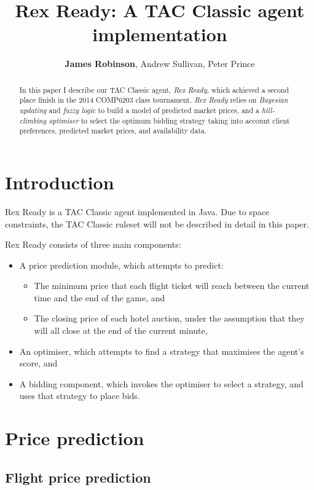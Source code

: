 \documentclass[a4paper]{proc}
\title{Rex Ready: A TAC Classic agent implementation}
\author{\textbf{James Robinson}, Andrew Sullivan, Peter Prince}
\begin{document}
\maketitle

\begin{abstract}
  In this paper I describe our TAC Classic agent, \emph{Rex Ready}, which achieved a second place finish in the 2014 COMP6203 class tournament. \emph{Rex Ready} relies on \emph{Bayesian updating} and \emph{fuzzy logic} to build a model of predicted market prices, and a \emph{hill-climbing optimiser} to select the optimum bidding strategy taking into account client preferences, predicted market prices, and availability data.
\end{abstract}

\section{Introduction}

Rex Ready is a TAC Classic agent implemented in Java. Due to space constraints, the TAC Classic ruleset will not be described in detail in this paper.

Rex Ready consists of three main components:

\begin{itemize}
  \item A price prediction module, which attempts to predict:
  \begin{itemize}
    \item The minimum price that each flight ticket will reach between the current time and the end of the game, and
    \item The closing price of each hotel auction, under the assumption that they will all close at the end of the current minute,
  \end{itemize}
  \item An optimiser, which attempts to find a strategy that maximises the agent's score, and
  \item A bidding component, which invokes the optimiser to select a strategy, and uses that strategy to place bids.
\end{itemize}

\section{Price prediction}

\subsection{Flight price prediction}
\end{document}
